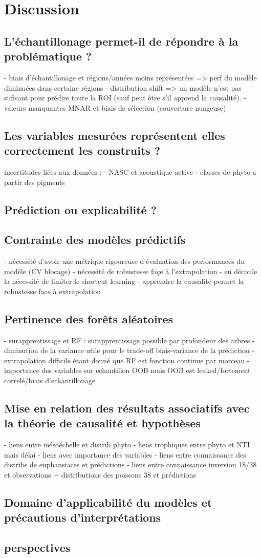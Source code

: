 \chapter{Discussion}
\section{L'échantillonage permet-il de répondre à la problématique ?}
- biais d'échantillonage et régions/années moins représentées => perf du modèle diminuées dans certaine régions
- distribution shift => un modèle n'est pas sufisant pour prédire toute la ROI (sauf peut être s'il apprend la causalité).
- valeurs manquantes MNAR et biais de sélection (couverture nuageuse)

\section{Les variables mesurées représentent elles correctement les construits ?}
incertitudes liées aux données :
- NASC et acoustique active
- classes de phyto a partir des pigments

\section{Prédiction ou explicabilité ?}

\section{Contrainte des modèles prédictifs}
- nécessité d'avoir une métrique rigoureuse d'évaluation des performances du modèle (CV blocage)
- nécessité de robustesse façe à l'extrapolation 
- en découle la nécessité de limiter le shortcut learning
- apprendre la causalité permet la robustesse face à extrapolation 

\section{Pertinence des forêts aléatoires}
- surapprentissage et RF : surapprentissage possible par profondeur des arbres
- diminution de la variance utile pour le trade-off biais-variance de la prédiction
- extrapolation difficile étant donné que RF est fonction continue par morceau 
- importance des variables sur echantillon OOB mais OOB est leaked/fortement correlé/biais d'echantillonage

\section{Mise en relation des résultats associatifs avec la théorie de causalité et hypothèses}
- liens entre mésoéchelle et distrib phyto 
- liens trophiques entre phyto et NTI mais délai
- liens avec importance des variables
- liens entre connaissance des distribs de euphausiaces et prédictions
- liens entre connaissance inversion 18/38 et observations + distributions des poissons 38 et prédictions

\section{Domaine d'applicabilité du modèles et précautions d'interprétations}

\section{perspectives}